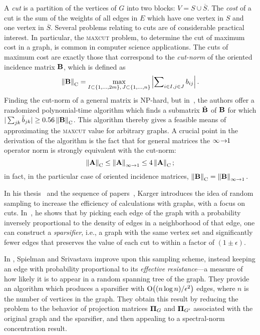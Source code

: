 A \emph{cut} is a partition of the vertices of $G$ into two blocks:
$V=S\cup\overline{S}$. The \emph{cost} of a cut is the sum of the weights of all
edges in $E$ which have one vertex in $S$ and one vertex in
$\overline{S}$.
Several problems relating to cuts are of considerable practical interest. In
particular, the \textsc{maxcut} problem, to determine the cut of maximum cost in
a graph, is common in computer science applications. The cuts of maximum cost
are exactly those that correspond to the \emph{cut-norm} of the oriented incidence matrix
$\mathbf{B}$, which is defined as 
\[
\left\|\mathbf{B}\right\|_{\text{\rmfamily{C}}}=\max_{I \subset \{1,\ldots,2m\},\, J \subset \{1,\ldots,n\}} 
\left| \sum\nolimits_{i \in I, j \in J} b_{ij} \right|.
\]
Finding the cut-norm of
a general matrix is \textsc{NP}-hard, but in~\cite{AN04}, the authors offer a
randomized polynomial-time algorithm which finds a submatrix $\tilde{\mathbf{B}}$
of $\mathbf{B}$ for which $|\sum_{jk}\tilde{b}_{jk}|\geq0.56\left\|\mathbf{B}\right\|_{\text{\rmfamily{C}}}$. This
algorithm thereby gives a feasible means of approximating the \textsc{maxcut}
value for arbitrary graphs. A crucial point in the derivation of the algorithm is 
the fact that for general matrices the $\infty\!\rightarrow\!\!1$ operator norm is strongly equivalent 
with the cut-norm: 
\[
\left\|\mathbf{A}\right\|_{\text{\rmfamily{C}}}\leq\left\|\mathbf{A}\right\|_{\infty\rightarrow 1}\leq4\left\|\mathbf{A}\right\|_{\text{\rmfamily{C}}};
\]
in fact, in the particular case of oriented incidence matrices, 
$\left\|\mathbf{B}\right\|_{\text{\rmfamily{C}}} = \left\|\mathbf{B}\right\|_{\infty\rightarrow 1}.$

In his thesis~\cite{Kar95th} and the sequence of papers~\cite{Kar94a,Kar94b,Kar96}, 
Karger introduces the idea of random sampling to
increase the efficiency of calculations with graphs, with a focus on cuts. 
In~\cite{Kar96}, he shows that by picking each edge of the graph with a probability
inversely proportional to the density of edges in a neighborhood of that edge,
one can construct a \emph{sparsifier}, i.e., a graph with the same vertex set
and significantly fewer edges that preserves the value of each cut to within a
factor of $(1\pm\epsilon)$.

In \cite{SS08}, Spielman and Srivastava improve upon this sampling scheme,
instead keeping an edge with probability proportional to its \emph{effective
resistance}---a measure of how likely it is to appear in a random spanning tree
of the graph. They provide an algorithm which produces a sparsifier with
$\mathop{\text{O}}\!\left((n\log n)/\epsilon^{2}\right)$ edges, where $n$ is the number of vertices in
the graph. They obtain this result by reducing the problem to the behavior of
projection matrices $\mathbf{\Pi}_{G}$ and $\mathbf{\Pi}_{G^{\prime}}$ associated with the
original graph and the sparsifier, and then appealing to a spectral-norm
concentration result.

